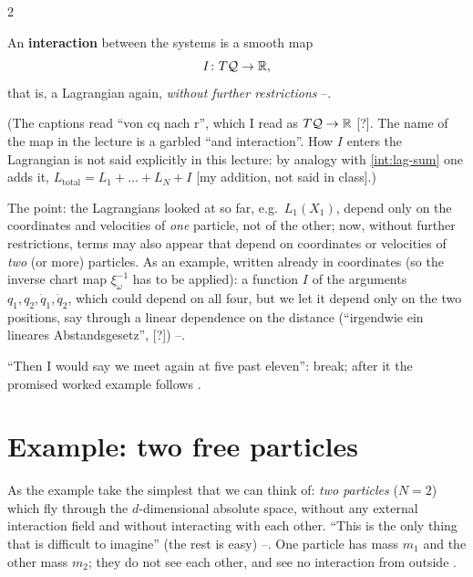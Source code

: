 \begin{paracol}{2}
\begin{definition}\label{def:mp-interaction}
An \textbf{interaction} between the systems is a smooth map
\begin{equation}\label{eq:mp-I}
  I\colon T\mathcal Q\to\mathbb{R} ,
\end{equation}
that is, a Lagrangian again, \emph{without further restrictions} --.
\end{definition}
(The captions read ``von cq nach r'', which I read as $T\mathcal Q\to\mathbb{R}$ [?]. The name of the map in the lecture is a garbled ``and interaction''. How $I$ enters the Lagrangian is not said explicitly in this lecture: by analogy with \cref{int:lag-sum} one adds it, $L_{\text{total}}=L_1+\dots+L_N+I$ [my addition, not said in class].)

The point: the Lagrangians looked at so far, e.g.\ $L_1(X_1)$, depend only on the coordinates and velocities of \emph{one} particle, not of the other; now, without further restrictions, terms may also appear that depend on coordinates or velocities of \emph{two} (or more) particles. As an example, written already in coordinates (so the inverse chart map $\xi_\omega^{-1}$ has to be applied): a function $I$ of the arguments $q_1,q_2,\dot q_1,\dot q_2$, which could depend on all four, but we let it depend only on the two positions, say through a linear dependence on the distance (``irgendwie ein lineares Abstandsgesetz'', [?]) --.

\begin{coursenote}\label{cn:mp-break}
``Then I would say we meet again at five past eleven'': break; after it the promised worked example follows .
\end{coursenote}

\section{Example: two free particles}\label{sec:mp-example}

As the example take the simplest that we can think of: \emph{two particles} ($N=2$) which fly through the $d$-dimensional absolute space, without any external interaction field and without interacting with each other. ``This is the only thing that is difficult to imagine'' (the rest is easy) --. One particle has mass $m_1$ and the other mass $m_2$; they do not see each other, and see no interaction from outside .


\end{paracol}
